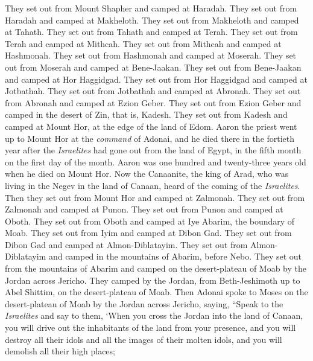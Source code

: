 \begin{biblechapter}
\verse They set out from Mount Shapher and camped at Haradah.
\verse They set out from Haradah and camped at Makheloth.
\verse They set out from Makheloth and camped at Tahath.
\verse They set out from Tahath and camped at Terah.
\verse They set out from Terah and camped at Mithcah.
\verse They set out from Mithcah and camped at Hashmonah.
\verse They set out from Hashmonah and camped at Moserah.
\verse They set out from Moserah and camped at Bene-Jaakan.
\verse They set out from Bene-Jaakan and camped at Hor Haggidgad.
\verse They set out from Hor Haggidgad and camped at Jotbathah.
\verse They set out from Jotbathah and camped at Abronah.
\verse They set out from Abronah and camped at Ezion Geber.
\verse They set out from Ezion Geber and camped in the desert of Zin, that is, Kadesh.
\verse They set out from Kadesh and camped at Mount Hor, at the edge of the land of Edom.
\verse Aaron the priest went up to Mount Hor at the \textit{command} of Adonai, and he died there in the fortieth year after the \textit{Israelites} had gone out from the land of Egypt, in the fifth month on the first day of the month.
\verse Aaron was one hundred and twenty-three years old when he died on Mount Hor.
\verse Now the Canaanite, the king of Arad, who was living in the Negev in the land of Canaan, heard of the coming of the \textit{Israelites}.
\verse Then they set out from Mount Hor and camped at Zalmonah.
\verse They set out from Zalmonah and camped at Punon.
\verse They set out from Punon and camped at Oboth.
\verse They set out from Oboth and camped at Iye Abarim, the boundary of Moab.
\verse They set out from Iyim and camped at Dibon Gad.
\verse They set out from Dibon Gad and camped at Almon-Diblatayim.
\verse They set out from Almon-Diblatayim and camped in the mountains of Abarim, before Nebo.
\verse They set out from the mountains of Abarim and camped on the desert-plateau of Moab by the Jordan across Jericho.
\verse They camped by the Jordan, from Beth-Jeshimoth up to Abel Shittim, on the desert-plateau of Moab.
\verse Then Adonai spoke to Moses on the desert-plateau of Moab by the Jordan across Jericho, saying,
\verse “Speak to the \textit{Israelites} and say to them, ‘When you cross the Jordan into the land of Canaan,
\verse you will drive out the inhabitants of the land from your presence, and you will destroy all their idols and all the images of their molten idols, and you will demolish all their high places;

\end{biblechapter}
